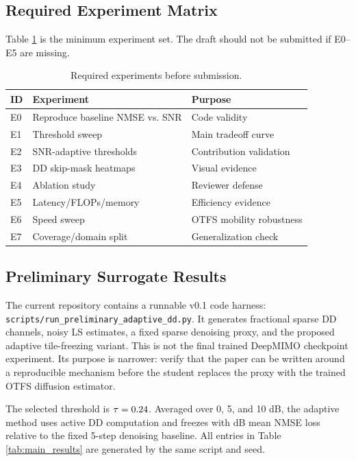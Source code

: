 \documentclass[10pt,journal]{IEEEtran}
\begin{document}
\subsection{Required Experiment Matrix}

Table \ref{tab:experiment_matrix} is the minimum experiment set. The draft
should not be submitted if E0--E5 are missing.

\begin{table}[t]
\caption{Required experiments before submission.}
\label{tab:experiment_matrix}
\centering
\begin{tabular}{lll}
\toprule
ID & Experiment & Purpose \\
\midrule
E0 & Reproduce baseline NMSE vs. SNR & Code validity \\
E1 & Threshold sweep & Main tradeoff curve \\
E2 & SNR-adaptive thresholds & Contribution validation \\
E3 & DD skip-mask heatmaps & Visual evidence \\
E4 & Ablation study & Reviewer defense \\
E5 & Latency/FLOPs/memory & Efficiency evidence \\
E6 & Speed sweep & OTFS mobility robustness \\
E7 & Coverage/domain split & Generalization check \\
\bottomrule
\end{tabular}
\end{table}

\subsection{Preliminary Surrogate Results}

The current repository contains a runnable v0.1 code harness:
\texttt{scripts/run\_preliminary\_adaptive\_dd.py}. It generates fractional
sparse DD channels, noisy LS estimates, a fixed sparse denoising proxy, and the
proposed adaptive tile-freezing variant. This is not the final trained DeepMIMO
checkpoint experiment. Its purpose is narrower: verify that the paper can be
written around a reproducible mechanism before the student replaces the proxy
with the trained OTFS diffusion estimator.

The selected threshold is $\tau=0.24{}$. Averaged over 0, 5, and 10 dB,
the adaptive method uses \PrelimMeanActive{} active DD computation and freezes
\PrelimMeanInactive{} with \PrelimMeanLoss{} dB mean NMSE loss relative to the
fixed 5-step denoising baseline. All entries in Table \ref{tab:main_results}
are generated by the same script and seed.
\end{document}
